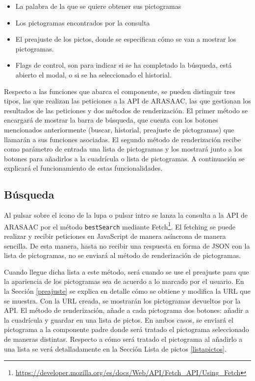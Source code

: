 \begin{itemize}
	\item La palabra de la que se quiere obtener sus pictogramas
	\item Los pictogramas encontrados por la consulta
	\item El preajuste de los pictos, donde se especifican cómo se van a mostrar los pictogramas.
	\item Flags de control, son para indicar si se ha completado la búsqueda, está abierto el modal, o si se ha seleccionado el historial.     
\end{itemize}

Respecto a las funciones que abarca el componente, se pueden distinguir tres tipos, las que realizan las peticiones a la API de ARASAAC, las que gestionan los resultados de las peticiones y dos métodos de renderización. El primer método se encargará de mostrar la barra de búsqueda, que cuenta con los botones mencionados anteriormente (buscar, historial, preajuste de pictogramas) que llamarán a sus funciones asociadas. El segundo método de renderización recibe como parámetro de entrada una lista de pictogramas y los mostrará junto a los botones para añadirlos a la cuadrícula o lista de pictogramas. A continuación se explicará el funcionamiento de estas funcionalidades. 


\subsection{Búsqueda}

Al pulsar sobre el icono de la lupa o pulsar intro se lanza la consulta a la API de ARASAAC por el método \texttt{bestSearch} mediante Fetch\footnote{\url{https://developer.mozilla.org/es/docs/Web/API/Fetch_API/Using_Fetch}}. El fetching se puede realizar y recibir peticiones en JavaScript de manera asíncrona de manera sencilla. De esta manera, hasta no recibir una respuesta en forma de JSON con la lista de pictogramas, no se enviará al método de renderización de pictogramas. 

Cuando llegue dicha lista a este método, será cuando se use el preajuste para que la apariencia de los pictogramas sea de acuerdo a lo marcado por el usuario. En la Sección \ref{preajuste} se explica en detalle cómo se obtiene y modifica la URL que se muestra. Con la URL creada, se mostrarán los pictogramas devueltos por la API. El método de renderización, añade a cada pictograma dos botones: añadir a la cuadrícula y guardar en una lista de pictos. En ambos casos, se enviará el pictograma a la componente padre donde será tratado el pictograma seleccionado de maneras distintas. Respecto a cómo será tratado el pictograma al añadirlo a una lista se verá detalladamente en la Sección Lista de pictos \ref{listapictos}.

